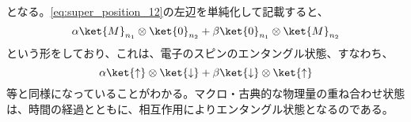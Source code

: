 となる。\eqref{eq:super_position_12}の左辺を単純化して記載すると、
\begin{equation}
    \alpha \ket{M}_{n_1} \otimes \ket{0}_{n_2} + \beta \ket{0}_{n_1} \otimes \ket{M}_{n_2}
\end{equation}
という形をしており、これは、電子のスピンのエンタングル状態、すなわち、
\begin{equation}
    \label{eq:electron_spin_entangle}
    \alpha \ket{\uparrow} \otimes \ket{\downarrow} + \beta \ket{\downarrow} \otimes \ket{\uparrow}
\end{equation}
等と同様になっていることがわかる。マクロ・古典的な物理量の重ね合わせ状態は、時間の経過とともに、相互作用によりエンタングル状態となるのである。
